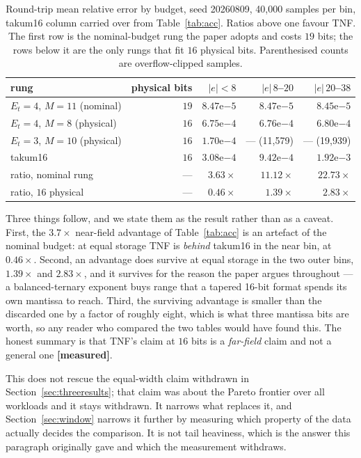 \begin{table}[t]\centering
\caption{Round-trip mean relative error by budget, seed 20260809, 40{,}000 samples
per bin, takum16 column carried over from Table~\ref{tab:acc}. Ratios above one
favour TNF. The first row is the nominal-budget rung the paper adopts and costs
$19$ bits; the rows below it are the only rungs that fit $16$ physical bits.
Parenthesised counts are overflow-clipped samples.}
\label{tab:accphys}
\small
\begin{tabular}{lrrrr}
\toprule
rung & physical bits & $|e|<8$ & $|e|\,8$--$20$ & $|e|\,20$--$38$ \\
\midrule
$E_t{=}4$, $M{=}11$ (nominal)   & $19$ & $8.47\mathrm{e}{-5}$ & $8.47\mathrm{e}{-5}$ & $8.45\mathrm{e}{-5}$ \\
$E_t{=}4$, $M{=}8$  (physical)  & $16$ & $6.75\mathrm{e}{-4}$ & $6.76\mathrm{e}{-4}$ & $6.80\mathrm{e}{-4}$ \\
$E_t{=}3$, $M{=}10$ (physical)  & $16$ & $1.70\mathrm{e}{-4}$ & --- (11{,}579) & --- (19{,}939) \\
takum16                         & $16$ & $3.08\mathrm{e}{-4}$ & $9.42\mathrm{e}{-4}$ & $1.92\mathrm{e}{-3}$ \\
\midrule
ratio, nominal rung  & --- & $\mathbf{3.63\times}$ & $\mathbf{11.12\times}$ & $\mathbf{22.73\times}$ \\
ratio, $16$ physical & --- & $0.46\times$ & $1.39\times$ & $2.83\times$ \\
\bottomrule
\end{tabular}
\end{table}

Three things follow, and we state them as the result rather than as a caveat.
First, the $3.7\times$ near-field advantage of Table~\ref{tab:acc} is an artefact
of the nominal budget: at equal storage TNF is \emph{behind} takum16 in the near
bin, at $0.46\times$. Second, an advantage does survive at equal storage in the two
outer bins, $1.39\times$ and $2.83\times$, and it survives for the reason the paper
argues throughout --- a balanced-ternary exponent buys range that a tapered
16-bit format spends its own mantissa to reach. Third, the surviving advantage is
smaller than the discarded one by a factor of roughly eight, which is what three
mantissa bits are worth, so any reader who compared the two tables would have
found this. The honest summary is that TNF's claim at $16$ bits is a
\emph{far-field} claim and not a general one \textbf{[measured]}.

This does not rescue the equal-width claim withdrawn in Section~\ref{sec:threeresults};
that claim was about the Pareto frontier over all workloads and it stays withdrawn.
It narrows what replaces it, and Section~\ref{sec:window} narrows it further by
measuring which property of the data actually decides the comparison. It is not
tail heaviness, which is the answer this paragraph originally gave and which the
measurement withdraws.

